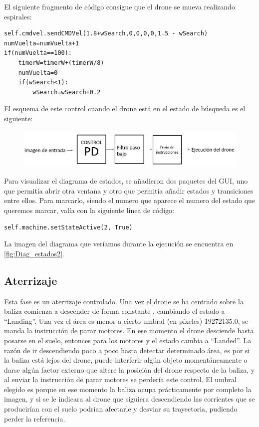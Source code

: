 El siguiente fragmento de c\'odigo consigue que el drone se mueva realizando espirales: \\

\begin{lstlisting}[backgroundcolor=\color{yellow}]
self.cmdvel.sendCMDVel(1.8+wSearch,0,0,0,0,1.5 - wSearch)
numVuelta=numVuelta+1
if(numVuelta==100):
    timerW=timerW+(timerW/8)
    numVuelta=0
    if(wSearch<1):
        wSearch=wSearch+0.2
\end{lstlisting}

\hspace{1 cm} El esquema de este control cuando el drone est\'a en el estado de b\'usqueda es el siguiente:
\begin{figure}[ht]
	\centering
		\includegraphics[width=1\textwidth]{imgs/esquemapd2.png}
	\label{fig:Esquema_control}
\end{figure}


\hspace{1cm} Para visualizar el diagrama de estados, se añadieron dos paquetes del GUI, uno que permit\'ia abrir otra ventana y otro que permit\'ia añadir estados y transiciones entre ellos. Para marcarlo, siendo el numero que aparece el numero del estado que queremos marcar, val\'ia con la siguiente linea de c\'odigo:

\begin{lstlisting}[backgroundcolor=\color{yellow}]
self.machine.setStateActive(2, True)
\end{lstlisting}
	
\hspace{1cm}La imagen del diagrama que ver\'iamos durante la ejecuci\'on se encuentra en \ref{fig:Diag_estados2}.

\subsection{Aterrizaje}

\hspace{1 cm} Esta fase es un aterrizaje controlado. Una vez el drone se ha centrado sobre la baliza comienza a descender de forma constante , cambiando el estado a "`Landing"'. Una vez el \'area es menor a cierto umbral (en p\'ixeles) 19272135.0, se manda la instrucci\'on de parar motores. En ese momento el drone desciende hasta posarse en el suelo, entonces para los motores y el estado cambia a "`Landed"'. La raz\'on de ir descendiendo poco a poco hasta detectar determinado \'area, es por si la baliza est\'a lejos del drone, puede interferir alg\'un objeto moment\'aneamente o darse alg\'un factor externo que altere la posici\'on del drone respecto de la baliza, y al enviar la instrucci\'on de parar motores se perder\'ia este control. El umbral elegido es porque en ese momento la baliza ocupa pr\'acticamente por completo la imagen, y si se le indicara al drone que siguiera descendiendo las corrientes que se producir\'ian con el suelo podr\'ian afectarle y desviar su trayectoria, pudiendo perder la referencia.



